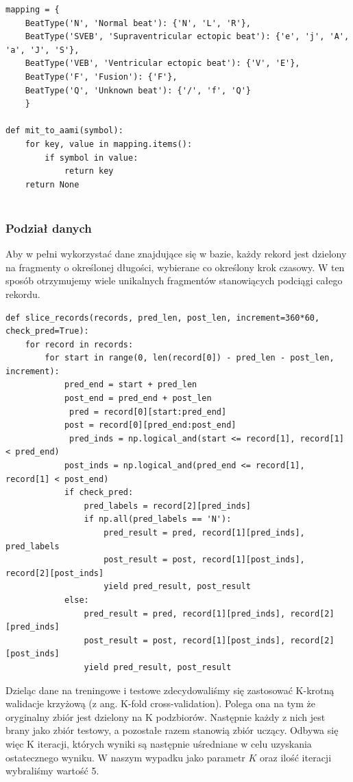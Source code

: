 \documentclass[polish,12pt]{aghthesis}
\begin{document}
\begin{lstlisting}[float=h!, caption={Kod mapujący oznaczenia z bazy MIT-BIH do standardu AAMI}]
mapping = {
	BeatType('N', 'Normal beat'): {'N', 'L', 'R'},
	BeatType('SVEB', 'Supraventricular ectopic beat'): {'e', 'j', 'A', 'a', 'J', 'S'},
	BeatType('VEB', 'Ventricular ectopic beat'): {'V', 'E'},
	BeatType('F', 'Fusion'): {'F'},
	BeatType('Q', 'Unknown beat'): {'/', 'f', 'Q'}
	}

def mit_to_aami(symbol):
	for key, value in mapping.items():
		if symbol in value:
			return key
	return None
	
\end{lstlisting}
 
\subsubsection{Podział danych}

Aby w pełni wykorzystać dane znajdujące się w bazie, każdy rekord jest dzielony na fragmenty o określonej długości, wybierane co określony krok czasowy. W ten sposób otrzymujemy wiele unikalnych fragmentów stanowiących podciągi całego rekordu.

\begin{lstlisting}[float=h!, caption={Funkcja dzieląca rekordy na fragmenty}]
def slice_records(records, pred_len, post_len, increment=360*60, check_pred=True):
    for record in records:
        for start in range(0, len(record[0]) - pred_len - post_len, increment):
            pred_end = start + pred_len
            post_end = pred_end + post_len
             pred = record[0][start:pred_end]
            post = record[0][pred_end:post_end]
             pred_inds = np.logical_and(start <= record[1], record[1] < pred_end)
            post_inds = np.logical_and(pred_end <= record[1], record[1] < post_end)
            if check_pred:
                pred_labels = record[2][pred_inds]
                if np.all(pred_labels == 'N'):
                    pred_result = pred, record[1][pred_inds], pred_labels
                    post_result = post, record[1][post_inds], record[2][post_inds]
                    yield pred_result, post_result
            else:
                pred_result = pred, record[1][pred_inds], record[2][pred_inds]
                post_result = post, record[1][post_inds], record[2][post_inds]
                yield pred_result, post_result

\end{lstlisting}

Dzieląc dane na treningowe i testowe zdecydowaliśmy się zastosować K-krotną walidacje krzyżową (z ang. K-fold cross-validation). Polega ona na tym że oryginalny zbiór jest dzielony na K podzbiorów. Następnie każdy z nich jest brany jako zbiór testowy, a pozostałe razem stanowią zbiór uczący. Odbywa się więc K iteracji, których wyniki są następnie uśredniane w celu uzyskania ostatecznego wyniku. W naszym wypadku jako parametr $K$ oraz ilość iteracji wybraliśmy wartość 5.
\end{document}
